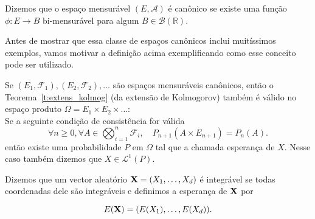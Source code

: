 \begin{definition}
  Dizemos que o espaço mensurável $(E, \mathcal{A})$ é canônico  se existe uma função $\phi: E \to B$ bi-mensurável para algum $B \in \mathcal{B}(\mathbb{R})$.
\end{definition}

Antes de mostrar que essa classe de espaços canônicos inclui muitíssimos exemplos, vamos motivar a definição acima exemplificando como esse conceito pode ser utilizado.

\begin{theorem}
  Se $(E_1,\mathcal{F}_1), (E_2,\mathcal{F}_2), \dots$ são espaços mensuráveis canônicos, então o Teorema~\ref{t:extens_kolmog} (da extensão de Kolmogorov)
  também é válido no espaço produto $\Omega = E_1 \times E_2 \times \dots$: \\
  Se a seguinte condição de consistência for válida
  \begin{equation}
   \forall n\ge 0, \forall A \in \bigotimes_{i=1}^n \mathcal{F}_i,\quad P_{n+1}(A\times E_{n+1})=P_n(A).
  \end{equation}
então existe uma probabilidade $P$ em $\Omega$ tal que
  a chamada esperança de $X$. 
  Nesse caso também dizemos que $X \in \mathcal{L}^1(P)$.

  \medskip

  Dizemos que um vector aleatório ${\bf X}=(X_1,\dots,X_d)$ é integrável se todas coordenadas dele são integráveis e definimos a esperança de ${\bf X}$ por

    \begin{equation}
    E({\bf X}) = (E(X_1),\dots, E(X_d)).
  \end{equation}
\end{theorem}

